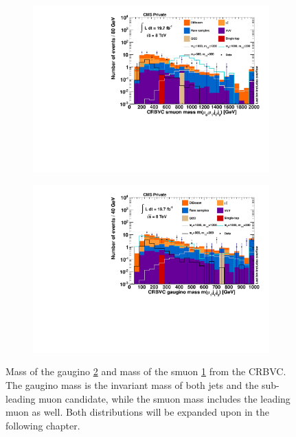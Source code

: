 \begin{figure}[htb!]
  \centering
  \begin{subfigure}[b]{0.495\textwidth}
    \centering
    \includegraphics[width=\textwidth]{plots/CR6_m_smuon_nofakes.pdf}
    \caption{\label{fig:CRBVC_m_smuon_nofakes}}
  \end{subfigure}
  \begin{subfigure}[b]{0.495\textwidth}
    \centering
    \includegraphics[width=\textwidth]{plots/CR6_m_gaugino_nofakes.pdf}
    \caption{\label{fig:CRBVC_m_gaugino_nofakes}}
  \end{subfigure}

  \caption{Mass of the gaugino \ref{fig:CRBVC_m_gaugino_nofakes} and mass of the smuon \ref{fig:CRBVC_m_smuon_nofakes} from the CRBVC. The gaugino mass is the invariant mass of both jets and the sub-leading muon candidate, while the smuon mass includes the leading muon as well. Both distributions will be expanded upon in the following chapter.}
  \label{fig:ssccr_nofakes}
\end{figure}

